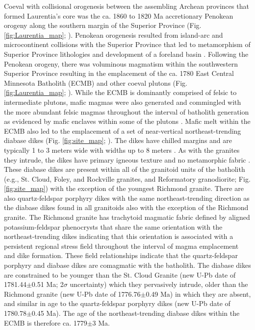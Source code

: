 \documentclass[draft]{agujournal2019}
\begin{document}
Coeval with collisional orogenesis between the assembling Archean provinces that formed Laurentia's core was the ca. 1860 to 1820 Ma accretionary Penokean orogeny along the southern margin of the Superior Province (Fig. \ref{fig:Laurentia_map}; ). Penokean orogenesis resulted from island-arc and microcontinent collisions with the Superior Province that led to metamorphism of Superior Province lithologies and development of a foreland basin \cite{Schulz2007a, Holm2019a}. Following the Penokean orogeny, there was voluminous magmatism within the southwestern Superior Province resulting in the emplacement of the ca. 1780 East Central Minnesota Batholith (ECMB) and other coeval plutons (Fig. \ref{fig:Laurentia_map}; ). While the ECMB is dominantly comprised of felsic to intermediate plutons, mafic magmas were also generated and commingled with the more abundant felsic magmas throughout the interval of batholith generation as evidenced by mafic enclaves within some of the plutons \cite{Boerboom2005b, Boerboom2011b, Schmitz2018a}. Mafic melt within the ECMB also led to the emplacement of a set of near-vertical northeast-trending diabase dikes (Fig. \ref{fig:site_map}; ).  The dikes have chilled margins and are typically 1 to 3 meters wide with widths up to 8 meters \cite{Boerboom2005b}. As with the granites they intrude, the dikes have primary igneous texture and no metamorphic fabric \cite{Boerboom2005b}. These diabase dikes are present within all of the granitoid units of the batholith (e.g., St. Cloud, Foley, and Rockville granites, and Reformatory granodiorite; Fig. \ref{fig:site_map}) with the exception of the youngest Richmond granite. There are also quartz-feldspar porphyry dikes with the same northeast-trending direction as the diabase dikes found in all granitoids also with the exception of the Richmond granite. The Richmond granite has trachytoid magmatic fabric defined by aligned potassium-feldspar phenocrysts that share the same orientation with the northeast-trending dikes \cite{Boerboom2000a} indicating that this orientation is associated with a persistent regional stress field throughout the interval of magma emplacement and dike formation. These field relationships indicate that the quartz-feldspar porphyry and diabase dikes are comagmatic with the batholith. The diabase dikes are constrained to be younger than the St. Cloud Granite (new U-Pb date of 1781.44$\pm$0.51 Ma; 2$\sigma$ uncertainty) which they pervasively intrude, older than the Richmond granite (new U-Pb date of 1776.76$\pm$0.49 Ma) in which they are absent, and similar in age to the quartz-feldspar porphyry dikes (new U-Pb date of 1780.78$\pm$0.45 Ma). The age of the northeast-trending diabase dikes within the ECMB is therefore ca. 1779$\pm$3 Ma.
\end{document}
